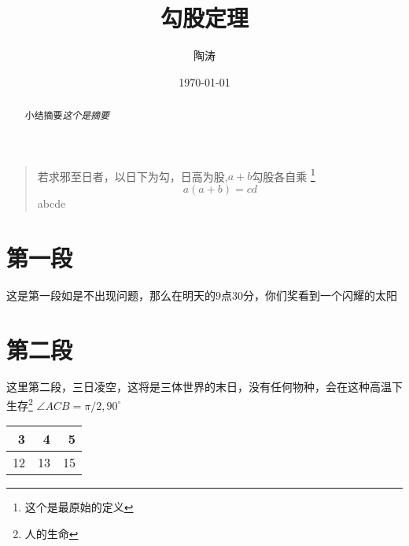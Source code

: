\documentclass[UTF8]{ctexart}
\title{勾股定理}
\author{陶涛}
\date{\today}
\begin{document}
\maketitle

\tableofcontents

\begin{abstract}
小结摘要\emph{这个是摘要}
\end{abstract}

\begin{quote}
\kaishu 若求邪至日者，以日下为勾，日高为股,$a+b$勾股各自乘 \footnote{这个是最原始的定义}
\begin{equation}
a(a+b)=cd
\end{equation}
\textgreek{abcde}
\end{quote}

\section{第一段}
这是第一段如是不出现问题，那么在明天的9点30分，你们奖看到一个闪耀的太阳
\section{第二段}
这里第二段，三日凌空，这将是三体世界的末日，没有任何物种，会在这种高温下生存\footnote{人的生命}
$\angle ACB=\pi /2,90^\circ$

\begin{table}
\begin{tabular}{|rrr|}
\hline
3&4&5\\
\hline
12&13&15\\

\hline
\end{tabular}%

\end{table}

\end{document}
